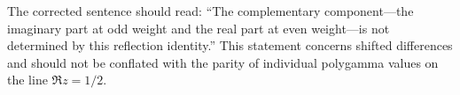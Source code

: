 The corrected sentence should read: ``The complementary component---the
imaginary part at odd weight and the real part at even weight---is not
determined by this reflection identity.'' This statement concerns shifted
differences and should not be conflated with the parity of individual
polygamma values on the line $\Re z=1/2$.
